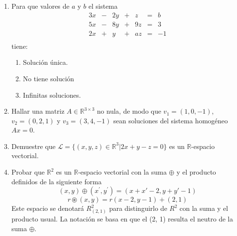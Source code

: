 \documentclass{article}
\begin{document}
\begin{enumerate}
\item Para que valores de $a$ y $b$ el sistema 
\[
\begin{array}{ccccccc}
 3x & - & 2y & + &  z & = &  b  \\
 5x & - & 8y & + & 9z & = &  3  \\
 2x & + &  y & + & az & = & -1  \\
\end{array}
\]
tiene:
\begin{enumerate}
    \item Solución única.
    \item  No tiene solución
    \item Infinitas soluciones.
\end{enumerate}
\item Hallar una matriz $A\in \mathbb{R}^{3\times 3}$ no nula, de modo que $v_1 = (1, 0, -1)$, $v_2 = (0, 2, 1)$ y $v_3 = (3, 4, -1)$ sean soluciones del sistema homogéneo $Ax = 0$.
\item Demuestre que $\mathcal{L} = \{(x, y, z) \in  \mathbb{R}^3 | 2x + y - z = 0\}$ es un $\mathbb{R}$-espacio vectorial.
\item Probar que $\mathbb{R}^2$ es un $\mathbb{R}$-espacio vectorial con la suma $\oplus$ y el producto
definidos de la siguiente forma
\[ (x, y)\oplus
 (x^\prime , y^\prime ) = (x + x\prime - 2, 
 y + y\prime - 1) \]
 \[ r \circledast(x, y) = r(x - 2, y - 1) + (2, 1)\]
Este espacio se denotará $R^2_{(2,1)}$ para distinguirlo de $R^2$ con la suma y el producto usual. La notación se basa en que el (2, 1) resulta el neutro de la suma $\oplus$.
\end{enumerate}
\end{document}
